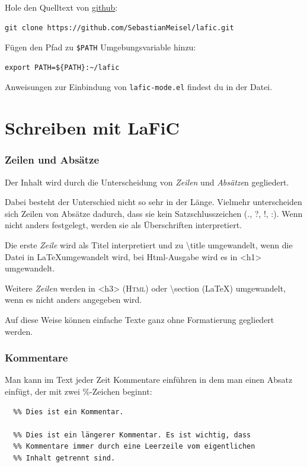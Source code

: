 \documentclass{scrartcl}
\begin{document}
Hole den Quelltext von \href{https://github.com}{github}:

\begin{verbatim}
git clone https://github.com/SebastianMeisel/lafic.git

\end{verbatim}

Fügen den Pfad zu \texttt{\$PATH} Umgebungsvariable hinzu:

\begin{verbatim}
export PATH=${PATH}:~/lafic

\end{verbatim}

Anweisungen zur Einbindung von \texttt{lafic-mode.el} findest du in der Datei.

\part{Schreiben mit LaFiC}

\section{Zeilen und Absätze}

Der Inhalt wird durch die Unterscheidung von  \emph{Zeilen} und
\emph{Absätze}n gegliedert.

Dabei besteht der Unterschied nicht so sehr in der
Länge. Vielmehr unterscheiden sich Zeilen von Absätze
dadurch, dass sie kein Satzschlusszeichen (., ?, !, :).
Wenn nicht anders festgelegt, werden sie als Überschriften
interpretiert.

Die erste \emph{Zeile} wird als Titel interpretiert und zu \textbackslash title
umgewandelt, wenn die Datei in \LaTeX umgewandelt wird, bei
Html-Ausgabe wird es in <h1> umgewandelt.

Weitere \emph{Zeilen} werden in <h3> (\textsc{Html}) oder \textbackslash section
(LaTeX) umgewandelt, wenn es nicht anders angegeben wird.

Auf diese Weise können einfache Texte ganz ohne Formatierung
gegliedert werden.

\section{Kommentare}

Man kann im Text jeder Zeit Kommentare einführen in dem man einen Absatz einfügt, der mit zwei \%-Zeichen beginnt:

\begin{verbatim}
  %% Dies ist ein Kommentar.

  %% Dies ist ein längerer Kommentar. Es ist wichtig, dass
  %% Kommentare immer durch eine Leerzeile vom eigentlichen
  %% Inhalt getrennt sind.

\end{verbatim}
\end{document}
